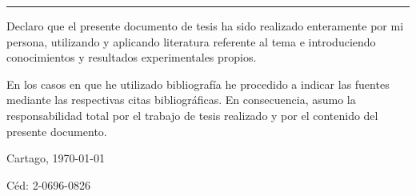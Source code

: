 \thispagestyle{empty}

\rule{10mm}{0pt}

\vfill

Declaro que el presente documento de tesis ha sido realizado enteramente
por mi persona, utilizando y aplicando literatura referente al tema e
introduciendo conocimientos y resultados experimentales propios.

En los casos en que he utilizado bibliografía he procedido a indicar las
fuentes mediante las respectivas citas bibliográficas.  En consecuencia,
asumo la responsabilidad total por el trabajo de tesis realizado y por
el contenido del presente documento.



\vspace*{8mm}

\begin{flushright}
  \thesisAuthor\par
  Cartago, \today\par
  Céd: 2-0696-0826
\end{flushright}

\cleardoublepage


